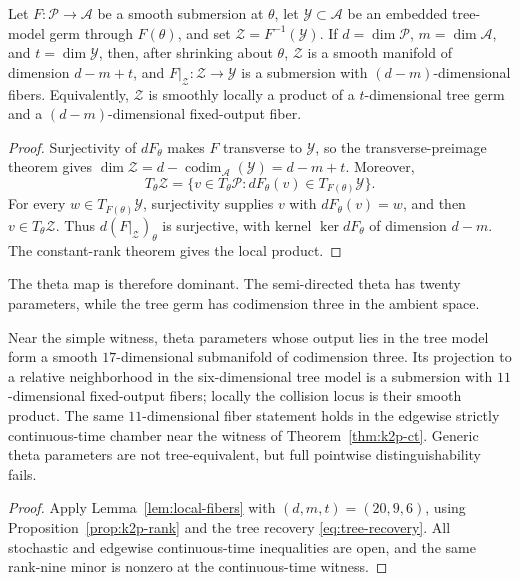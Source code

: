 \documentclass[11pt]{article}
\theoremstyle{remark}\newtheorem{remark}[theorem]{Remark}
\begin{document}
\begin{lemma}\label{lem:local-fibers}
Let $F:\mathcal P\to\mathcal A$ be a smooth submersion at $\theta$, let $\mathcal Y\subset\mathcal A$ be an embedded tree-model germ through $F(\theta)$, and set $\mathcal Z=F^{-1}(\mathcal Y)$. If $d=\dim\mathcal P$, $m=\dim\mathcal A$, and $t=\dim\mathcal Y$, then, after shrinking about $\theta$, $\mathcal Z$ is a smooth manifold of dimension $d-m+t$, and $F|_{\mathcal Z}:\mathcal Z\to\mathcal Y$ is a submersion with $(d-m)$-dimensional fibers. Equivalently, $\mathcal Z$ is smoothly locally a product of a $t$-dimensional tree germ and a $(d-m)$-dimensional fixed-output fiber.
\end{lemma}
\begin{proof}
Surjectivity of $dF_\theta$ makes $F$ transverse to $\mathcal Y$, so the transverse-preimage theorem gives $\dim\mathcal Z=d-\operatorname{codim}_{\mathcal A}(\mathcal Y)=d-m+t$. Moreover,
\[
T_\theta\mathcal Z=\{v\in T_\theta\mathcal P:dF_\theta(v)\in T_{F(\theta)}\mathcal Y\}.
\]
For every $w\in T_{F(\theta)}\mathcal Y$, surjectivity supplies $v$ with $dF_\theta(v)=w$, and then $v\in T_\theta\mathcal Z$. Thus $d(F|_{\mathcal Z})_\theta$ is surjective, with kernel $\ker dF_\theta$ of dimension $d-m$. The constant-rank theorem gives the local product.
\end{proof}

The theta map is therefore dominant. The semi-directed theta has twenty parameters, while the tree germ has codimension three in the ambient space.
\begin{corollary}\label{cor:k2p-geometry}
Near the simple witness, theta parameters whose output lies in the tree model form a smooth $17$-dimensional submanifold of codimension three. Its projection to a relative neighborhood in the six-dimensional tree model is a submersion with $11$-dimensional fixed-output fibers; locally the collision locus is their smooth product. The same $11$-dimensional fiber statement holds in the edgewise strictly continuous-time chamber near the witness of Theorem~\ref{thm:k2p-ct}. Generic theta parameters are not tree-equivalent, but full pointwise distinguishability fails.
\end{corollary}
\begin{proof}
Apply Lemma~\ref{lem:local-fibers} with $(d,m,t)=(20,9,6)$, using Proposition~\ref{prop:k2p-rank} and the tree recovery \eqref{eq:tree-recovery}. All stochastic and edgewise continuous-time inequalities are open, and the same rank-nine minor is nonzero at the continuous-time witness.
\end{proof}
\end{document}
